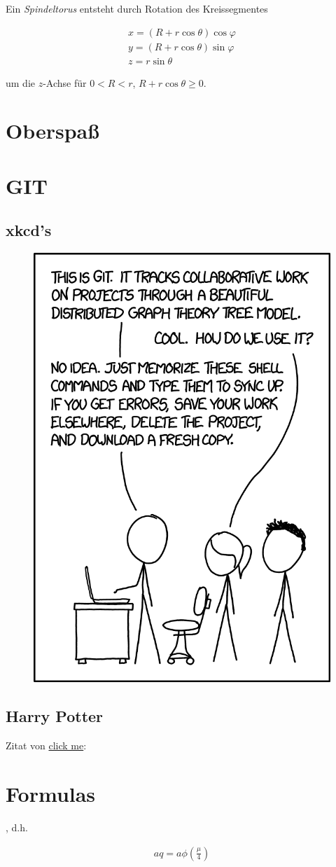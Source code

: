 \documentclass{article}
\begin{document}
Ein \textit{Spindeltorus} entsteht durch Rotation des Kreissegmentes

\begin{align*}
  x = (R + r \cos{\theta}) \cos{\varphi} \\
  y = (R + r \cos{\theta}) \sin{\varphi} \\
  z = r \sin{\theta}
\end{align*}

um die $z$-Achse für $0 < R < r$, $R + r \cos{\theta} \geq 0$.

\section{Oberspaß}

\section{GIT}

\subsection{xkcd's}

\begin{figure}[h!]
  \centering
  \includegraphics[width = 0.5 \linewidth]{images/git_2x.png}
\end{figure}

\subsection{Harry Potter}

Zitat von 
\href{https://www.hp-lexicon.org/quote/professor-snape-ugly-git/}{click me}: \\


\section{Formulas}

, d.h.

\begin{align}
  aq = a \phi \left( \frac{\mu}{4} \right)
\end{align}
\end{document}
